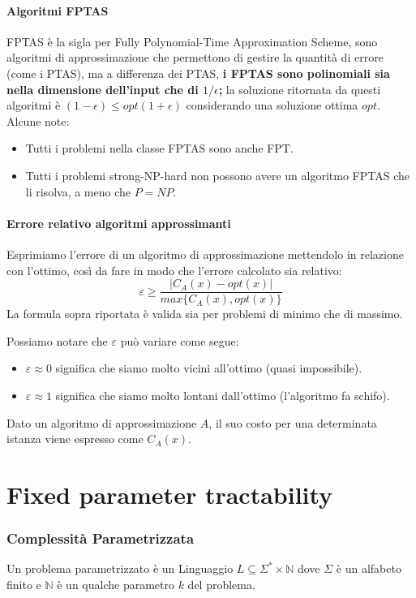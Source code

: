 \documentclass[12pt,a4paper]{article}
\begin{document}
\subsection{Algoritmi FPTAS}
FPTAS è la sigla per Fully Polynomial-Time Approximation Scheme, sono algoritmi di approssimazione che permettono di gestire la quantità di errore (come i PTAS), ma a differenza dei PTAS, \textbf{i FPTAS sono polinomiali sia nella dimensione dell'input che di $1/\epsilon$;} la soluzione ritornata da questi algoritmi è $(1 - \epsilon) \leq opt (1 + \epsilon)$ considerando una soluzione ottima $opt$.
Alcune note:
\begin{itemize}
\item Tutti i problemi nella classe FPTAS sono anche FPT.
\item Tutti i problemi strong-NP-hard non possono avere un algoritmo FPTAS che li risolva, a meno che $P = NP$.
\end{itemize}


\subsection{Errore relativo algoritmi approssimanti}
Esprimiamo l'errore di un algoritmo di approssimazione mettendolo in relazione con l'ottimo, così da fare in modo che l'errore calcolato sia relativo: $$\varepsilon \geqslant \dfrac{\vert C_A (x) - opt(x) \vert}{max\lbrace C_A (x), opt(x) \rbrace}$$
La formula sopra riportata è valida sia per problemi di minimo che di massimo.

Possiamo notare che $\varepsilon$ può variare come segue:
\begin{itemize}
\item $\varepsilon \approx 0$ significa che siamo molto vicini all'ottimo (quasi impossibile).
\item $\varepsilon \approx 1$ significa che siamo molto lontani dall'ottimo (l'algoritmo fa schifo).
\end{itemize}
Dato un algoritmo di approssimazione $A$, il suo costo per una determinata istanza viene espresso come $C_A (x)$.

\pagebreak
\part{Fixed parameter tractability}

\section{Complessità Parametrizzata}
Un problema parametrizzato è un Linguaggio $L \subseteq \Sigma^* \times \mathbb{N}$ dove $\Sigma$ è un alfabeto finito e $\mathbb{N}$ è un qualche parametro $k$ del problema.
\end{document}

